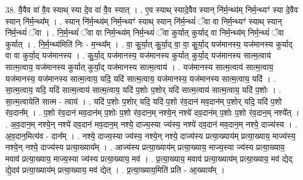 \documentclass[17pt]{extarticle}
\begin{document}
38. वै॒वैव वा॑ वै॒व स्याथ् स्या दे॒व वा॑ वै॒व स्यात् । . ए॒व स्याथ् स्यादे॒वैव स्यान् नि॑र्म॒न्थ्य॑म् निर्म॒न्थ्यꣳ॑ स्या दे॒वैव स्यान् नि॑र्म॒न्थ्य᳚म् । . स्यान् नि॑र्म॒न्थ्य॑म् निर्म॒न्थ्यꣳ॑ स्याथ् स्यान् नि॑र्म॒न्थ्यं॑ ॅवा वा निर्म॒न्थ्यꣳ॑ स्याथ् स्यान् नि॑र्म॒न्थ्यं॑ ॅवा । . नि॒र्म॒न्थ्यं॑ ॅवा वा निर्म॒न्थ्य॑म् निर्म॒न्थ्यं॑ ॅवा कुर्यात् कुर्याद् वा निर्म॒न्थ्य॑म् निर्म॒न्थ्यं॑ ॅवा कुर्यात् । . नि॒र्म॒न्थ्य॑मिति॑ निः - म॒न्थ्य᳚म् । . वा॒ कु॒र्या॒त् कु॒र्या॒द् वा॒ वा॒ कु॒र्या॒द् यज॑मानस्य॒ यज॑मानस्य कुर्याद् वा वा कुर्या॒द् यज॑मानस्य । . कु॒र्या॒द् यज॑मानस्य॒ यज॑मानस्य कुर्यात् कुर्या॒द् यज॑मानस्य सात्म॒त्वाय॑ सात्म॒त्वाय॒ यज॑मानस्य कुर्यात् कुर्या॒द् यज॑मानस्य सात्म॒त्वाय॑ । . यज॑मानस्य सात्म॒त्वाय॑ सात्म॒त्वाय॒ यज॑मानस्य॒ यज॑मानस्य सात्म॒त्वाय॒ यदि॒ यदि॑ सात्म॒त्वाय॒ यज॑मानस्य॒ यज॑मानस्य सात्म॒त्वाय॒ यदि॑ । . सा॒त्म॒त्वाय॒ यदि॒ यदि॑ सात्म॒त्वाय॑ सात्म॒त्वाय॒ यदि॑ प॒शोः प॒शोर् यदि॑ सात्म॒त्वाय॑ सात्म॒त्वाय॒ यदि॑ प॒शोः । . सा॒त्म॒त्वायेति॑ सात्म - त्वाय॑ । . यदि॑ प॒शोः प॒शोर् यदि॒ यदि॑ प॒शो र॑व॒दान॑ मव॒दान॑म् प॒शोर् यदि॒ यदि॑ प॒शो र॑व॒दान᳚म् । . प॒शो र॑व॒दान॑ मव॒दान॑म् प॒शोः प॒शो र॑व॒दान॒म् नश्ये॒न् नश्ये॑ दव॒दान॑म् प॒शोः प॒शो र॑व॒दान॒म् नश्ये᳚त् । . अ॒व॒दान॒म् नश्ये॒न् नश्ये॑ दव॒दान॑ मव॒दान॒म् नश्ये॒ दाज्य॒स्या ज्य॑स्य॒ नश्ये॑ दव॒दान॑ मव॒दान॒म् नश्ये॒ दाज्य॑स्य । . अ॒व॒दान॒मित्य॑व - दान᳚म् । . नश्ये॒ दाज्य॒स्या ज्य॑स्य॒ नश्ये॒न् नश्ये॒ दाज्य॑स्य प्रत्या॒ख्याय॑म् प्रत्या॒ख्याय॒ माज्य॑स्य॒ नश्ये॒न् नश्ये॒ दाज्य॑स्य प्रत्या॒ख्याय᳚म् । . आज्य॑स्य प्रत्या॒ख्याय॑म् प्रत्या॒ख्याय॒ माज्य॒स्या ज्य॑स्य प्रत्या॒ख्याय॒ मवाव॑ प्रत्या॒ख्याय॒ माज्य॒स्या ज्य॑स्य प्रत्या॒ख्याय॒ मव॑ । . प्र॒त्या॒ख्याय॒ मवाव॑ प्रत्या॒ख्याय॑म् प्रत्या॒ख्याय॒ मव॑ द्येद् द्ये॒दव॑ प्रत्या॒ख्याय॑म् प्रत्या॒ख्याय॒ मव॑ द्येत् । . प्र॒त्या॒ख्याय॒मिति॑ प्रति - आ॒ख्याय᳚म् । \newline
\end{document}
